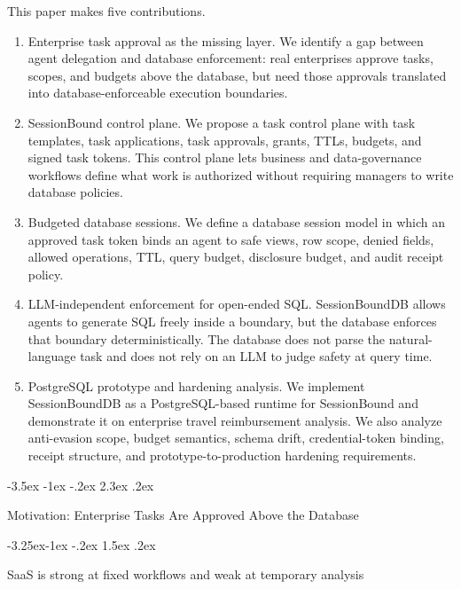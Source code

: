 \documentclass[10pt,twocolumn]{article}
\makeatletter
\renewcommand\section{\@startsection{section}{1}{\z@}%
  {-3.5ex \@plus -1ex \@minus -.2ex}%
  {2.3ex \@plus .2ex}%
  {\normalfont\Large\bfseries\raggedright}}
\renewcommand\subsection{\@startsection{subsection}{2}{\z@}%
  {-3.25ex\@plus -1ex \@minus -.2ex}%
  {1.5ex \@plus .2ex}%
  {\normalfont\large\bfseries\raggedright}}
\makeatother
\begin{document}
This paper makes five contributions.

\begin{enumerate}
\def\labelenumi{\arabic{enumi}.}
\item
  Enterprise task approval as the missing layer. We identify a
  gap between agent delegation and database enforcement: real
  enterprises approve tasks, scopes, and budgets above the database, but
  need those approvals translated into database-enforceable execution
  boundaries.
\item
  SessionBound control plane. We propose a task control plane
  with task templates, task applications, task approvals, grants, TTLs,
  budgets, and signed task tokens. This control plane lets business and
  data-governance workflows define what work is authorized without
  requiring managers to write database policies.
\item
  Budgeted database sessions. We define a database session
  model in which an approved task token binds an agent to safe views,
  row scope, denied fields, allowed operations, TTL, query budget,
  disclosure budget, and audit receipt policy.
\item
  LLM-independent enforcement for open-ended SQL.
  SessionBoundDB allows agents to generate SQL freely inside a boundary,
  but the database enforces that boundary deterministically. The
  database does not parse the natural-language task and does not rely on
  an LLM to judge safety at query time.
\item
  PostgreSQL prototype and hardening analysis. We implement
  SessionBoundDB as a PostgreSQL-based runtime for SessionBound and
  demonstrate it on enterprise travel reimbursement analysis. We also
  analyze anti-evasion scope, budget semantics, schema drift,
  credential-token binding, receipt structure, and
  prototype-to-production hardening requirements.
\end{enumerate}


\hypertarget{motivation-enterprise-tasks-are-approved-above-the-database}{%
\section{Motivation: Enterprise Tasks Are Approved Above the
Database}\label{motivation-enterprise-tasks-are-approved-above-the-database}}

\hypertarget{saas-is-strong-at-fixed-workflows-and-weak-at-temporary-analysis}{%
\subsection{SaaS is strong at fixed workflows and weak at
temporary
analysis}\label{saas-is-strong-at-fixed-workflows-and-weak-at-temporary-analysis}}
\end{document}
